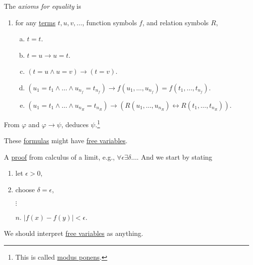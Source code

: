 \begin{definition}[Proof]
\begin{definition}
		\begin{definition}\label{def:axioms-for-equality}
			The \emph{axioms for equality} is
			\begin{enumerate}[label=(A\arabic*), resume]
				\item\label{A7} for any \hyperref[def:term]{terms} \(t, u, v, \ldots \), function symbols \(f\), and relation symbols \(R\),
				\begin{enumerate}[(a)]
					\item\label{def:axioms-for-equality-a} \(t = t\).
					\item\label{def:axioms-for-equality-b} \(t = u \to  u = t\).
					\item\label{def:axioms-for-equality-c} \((t=u \land u = v) \to  (t = v)\).
					\item\label{def:axioms-for-equality-d} \((u_1 = t_1 \land \ldots \land u_{n_f} = t_{n_f}) \to f(u_1, \ldots , u_{n_f}) = f(t_1, \ldots , t_{n_f})\).
					\item\label{def:axioms-for-equality-e} \((u_1 = t_1 \land \ldots \land u_{n_R} = t_{n_R}) \to (R(u_1, \ldots , u_{n_R}) \leftrightarrow R(t_1, \ldots , t_{n_R}))\).
				\end{enumerate}
			\end{enumerate}
		\end{definition}
	\end{definition}

	\begin{definition}\label{def:rule-of-inference}
		From \(\varphi \) and \(\varphi \to \psi\), deduces \(\psi \).\footnote{This is called \href{https://en.wikipedia.org/wiki/Modus_ponens}{modus ponens}.}
	\end{definition}
\end{definition}

These \hyperref[def:formula]{formulas} might have \hyperref[def:free-variable]{free variables}.

\begin{eg}
	A \hyperref[def:proof]{proof} from calculus of a limit, e.g., \(\forall \epsilon \exists \delta \ldots \). And we start by stating
	\begin{enumerate}
		\item let \(\epsilon > 0\),
		\item choose \(\delta =\epsilon \),
		\item[] \(\vdots\)
		\item[\(n\).] \(\vert f(x) - f(y) \vert < \epsilon \).
	\end{enumerate}
	We should interpret \hyperref[def:free-variable]{free variables} as anything.
\end{eg}

